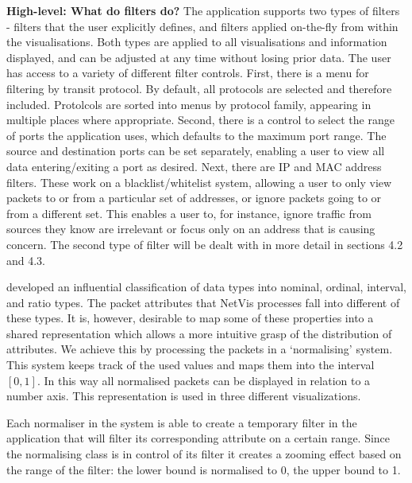 \textbf{High-level: What do filters do?}
The application supports two types of filters - filters that the user explicitly defines, and filters applied on-the-fly from within the visualisations.
Both types are applied to all visualisations and information displayed, and can be adjusted at any time without losing prior data.
The user has access to a variety of different filter controls.  First, there is a menu for filtering by transit protocol. By default, all protocols are selected and therefore included. Protolcols are sorted into menus by protocol family, appearing in multiple places where appropriate. Second, there is a control to select the range of ports the application uses, which defaults to the maximum port range.  The source and destination ports can be set separately, enabling a user to view all data entering/exiting a port as desired.  Next, there are IP and MAC address filters.  These work on a blacklist/whitelist system, allowing a user to only view packets to or from a particular set of addresses, or ignore packets going to or from a different set.  This enables a user to, for instance, ignore traffic from sources they know are irrelevant or focus only on an address that is causing concern.
The second type of filter will be dealt with in more detail in sections 4.2 and 4.3.

\cite{stevens1946theory} developed an influential classification of data types into nominal, ordinal, interval, and ratio types. The packet attributes that NetVis processes fall into different of these types. It is, however, desirable to map some of these properties into a shared representation which allows a more intuitive grasp of the distribution of attributes. We achieve this by processing the packets in a `normalising' system. This system keeps track of the used values and maps them into the interval $[0,1]$. In this way all normalised packets can be displayed in relation to a number axis. This representation is used in three different visualizations.

Each normaliser in the system is able to create a temporary filter in the application that will filter its corresponding attribute on a certain range.
Since the normalising class is in control of its filter it creates a zooming effect based on the range of the filter: the lower bound is normalised to 0, the upper bound to 1. 


